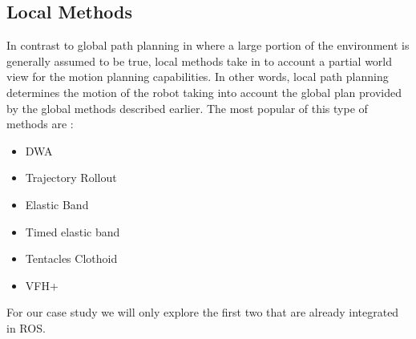 \subsection{Local Methods}
In contrast to global path planning in where a large portion of the environment is generally assumed to be true, local methods take in to account a partial world view for the motion planning capabilities. In other words, local path planning determines the motion of the robot taking into account the global plan provided by the global methods described earlier.
The most popular of this type of methods are \cite{inbookdwa}:
\begin{itemize}
    \item \ac{DWA} \cite{foxdwa}
    \item Trajectory Rollout  \cite{gerkey2008planning}
    \item Elastic Band \cite{siegwart2011introduction}
    \item Timed elastic band \cite{rosmann2013efficient}
    \item Tentacles Clothoid \cite{alia2015local}
    \item \ac{VFH}+ \cite{siegwart2011introduction}
\end{itemize}
For our case study we will only explore the first two that are already integrated in ROS.
